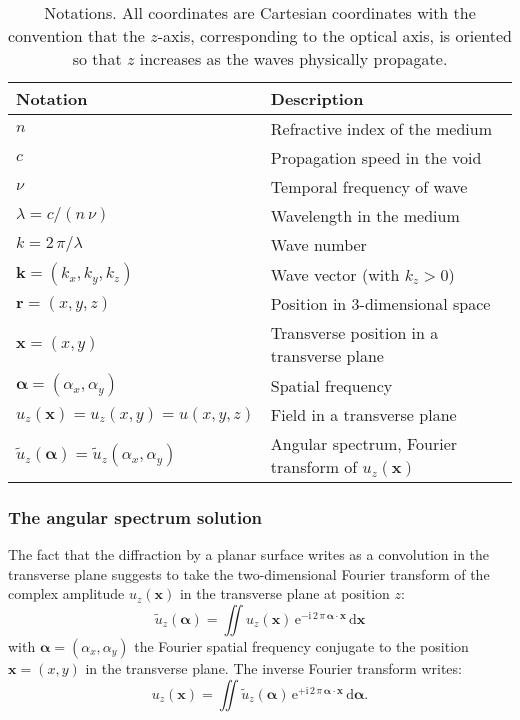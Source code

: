 \documentclass[a4paper]{article}
\newcommand{\V}[1]{\boldsymbol{#1}}
\newcommand*{\mathd}{\mathrm{d}}
\newcommand*{\mathe}{\mathrm{e}}
\newcommand*{\mathi}{\mathrm{i}}
\newcommand*{\FT}[1]{\widetilde{#1}}
\begin{document}
\begin{table}[t]
  \centering
  \begin{tabular}{ll}
    Notation & Description \\
    \hline
    $n$ & Refractive index of the medium\\
    $c$ & Propagation speed in the void\\
    $ν$ & Temporal frequency of wave\\
    $λ= c/(n\,ν)$ & Wavelength in the medium\\
    $k = 2\,π/λ$ & Wave number\\
    $\V{k} = (k_{x},k_{y},k_{z})$ & Wave vector (with $k_{z} > 0$)\\
    $\V{r} = (x,y,z)$ & Position in 3-dimensional space\\
    $\V{x} = (x,y)$ & Transverse position in a transverse plane\\
    $\V{α} = (α_{x},α_{y})$ & Spatial frequency\\
    $u_{z}(\V{x}) = u_{z}(x,y) = u(x,y,z)$ & Field in a transverse plane\\
    $\FT{u}_{z}(\V{α}) = \FT{u}_{z}(α_{x},α_{y})$
             & Angular spectrum, Fourier transform of $u_{z}(\V{x})$\\
  \end{tabular}
  \caption{Notations. All coordinates are Cartesian coordinates with the
    convention that the $z$-axis, corresponding to the optical axis, is
    oriented so that $z$ increases as the waves physically propagate.}
  \label{tab:notations}
\end{table}


\subsubsection{The angular spectrum solution}
\label{sec:angular-spectrum}

The fact that the diffraction by a planar surface writes as a convolution in
the transverse plane suggests to take the two-dimensional Fourier transform of
the complex amplitude $u_{z}(\V{x})$ in the transverse plane at position $z$:
\begin{equation}
  \label{eq:angular-spectrum}
  \FT{u}_{z}(\V{α}) = \iint u_{z}(\V{x})\,
  \mathe^{-\mathi\,2\,π\,\V{α}·\V{x}}\,
  \mathd\V{x}
\end{equation}
with $\V{α} = (α_{x},α_{y})$ the Fourier spatial frequency conjugate to the
position $\V{x} = (x,y)$ in the transverse plane. The inverse Fourier transform
writes:
\begin{equation}
  \label{eq:angular-spectrum-inverse}
  u_{z}(\V{x}) = \iint \FT{u}_{z}(\V{α})\,
  \mathe^{+\mathi\,2\,π\,\V{α}·\V{x}}\,
  \mathd\V{α}.
\end{equation}
\end{document}
